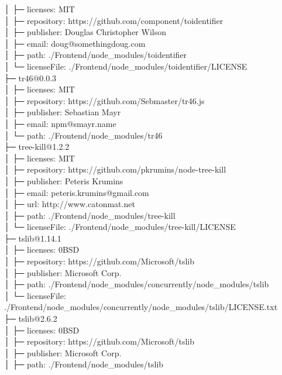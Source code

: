\documentclass[
    paper=a4,
    twoside=false,
    parskip=half,
    listof=entryprefix,
    listof=totoc,
    index=totoc,
    bibliography=totoc,
    headsepline,
]{scrbook}
\begin{document}
    │  ├─ licenses: MIT\\
    │  ├─ repository: https://github.com/component/toidentifier\\
    │  ├─ publisher: Douglas Christopher Wilson\\
    │  ├─ email: doug@somethingdoug.com\\
    │  ├─ path: ./Frontend/node\_modules/toidentifier\\
    │  └─ licenseFile: ./Frontend/node\_modules/toidentifier/LICENSE\\
    ├─ tr46@0.0.3\\
    │  ├─ licenses: MIT\\
    │  ├─ repository: https://github.com/Sebmaster/tr46.js\\
    │  ├─ publisher: Sebastian Mayr\\
    │  ├─ email: npm@smayr.name\\
    │  └─ path: ./Frontend/node\_modules/tr46\\
    ├─ tree-kill@1.2.2\\
    │  ├─ licenses: MIT\\
    │  ├─ repository: https://github.com/pkrumins/node-tree-kill\\
    │  ├─ publisher: Peteris Krumins\\
    │  ├─ email: peteris.krumins@gmail.com\\
    │  ├─ url: http://www.catonmat.net\\
    │  ├─ path: ./Frontend/node\_modules/tree-kill\\
    │  └─ licenseFile: ./Frontend/node\_modules/tree-kill/LICENSE\\
    ├─ tslib@1.14.1\\
    │  ├─ licenses: 0BSD\\
    │  ├─ repository: https://github.com/Microsoft/tslib\\
    │  ├─ publisher: Microsoft Corp.\\
    │  ├─ path: ./Frontend/node\_modules/concurrently/node\_modules/tslib\\
    │  └─ licenseFile: ./Frontend/node\_modules/concurrently/node\_modules/tslib/LICENSE.txt\\
    ├─ tslib@2.6.2\\
    │  ├─ licenses: 0BSD\\
    │  ├─ repository: https://github.com/Microsoft/tslib\\
    │  ├─ publisher: Microsoft Corp.\\
    │  ├─ path: ./Frontend/node\_modules/tslib\\
\end{document}
